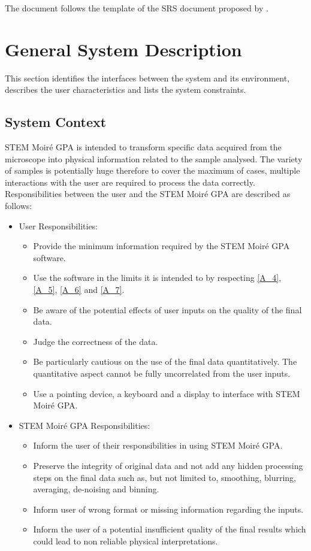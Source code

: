 \documentclass[12pt]{article}
\newcommand{\progname}{STEM Moir{\'e} GPA}
\begin{document}
The document follows the template of the SRS document proposed by \cite{SmithAndLai2005, SmithEtAl2007}. 

\section{General System Description}

This section identifies the interfaces between the system and its environment,
describes the user characteristics and lists the system constraints.

\subsection{System Context}

\progname{} is intended to transform specific data acquired from the microscope into physical information related to the sample analysed. The variety of samples is potentially huge therefore to cover the maximum of cases, multiple interactions with the user are required to process the data correctly. Responsibilities between the user and the \progname{} are described as follows:

\begin{itemize}
\item User Responsibilities:
\begin{itemize}
\item Provide the minimum information required by the \progname{} software.
\item Use the software in the limits it is intended to by respecting \cref{A_4}, \cref{A_5}, \cref{A_6} and \cref{A_7}.
\item Be aware of the potential effects of user inputs on the quality of the final data.
\item Judge the correctness of the data.
\item Be particularly cautious on the use of the final data quantitatively. The quantitative aspect cannot be fully uncorrelated from the user inputs. 
\item Use a pointing device, a keyboard and a display to interface with \progname{}.
\end{itemize}
\item \progname{} Responsibilities:
\begin{itemize}
\item Inform the user of their responsibilities in using \progname{}.
\item Preserve the integrity of original data and not add any hidden processing steps on the final data such as, but not limited to, smoothing, blurring, averaging, de-noising and binning.
\item Inform user of wrong format or missing information regarding the inputs.
\item Inform the user of a potential insufficient quality of the final results which could lead to non reliable physical interpretations.
\end{itemize}
\end{itemize}
\end{document}
